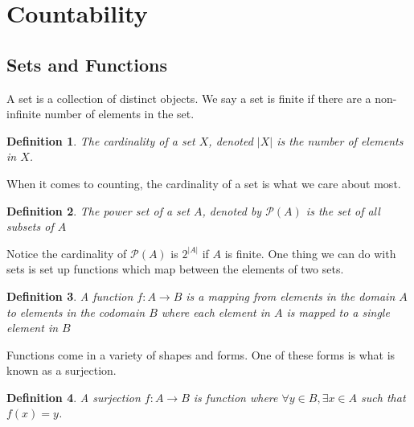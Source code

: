 \documentclass{article}
\newtheorem{definition}{Definition}
\begin{document}
\section{Countability}
\subsection{Sets and Functions}
A set is a collection of distinct objects. We say a set is finite if there are a non-infinite
number of elements in the set. 
\begin{definition}
    The cardinality of a set $X$, denoted $|X|$ is the number of elements in $X$.
\end{definition}
When it comes to counting, the cardinality of a set is what we care about most.
\begin{definition}
    The power set of a set $A$, denoted by $\mathcal{P}(A)$ is the set of all subsets of $A$
\end{definition}
Notice the cardinality of $\mathcal{P}(A)$ is $2^{|A|}$ if $A$ is finite.
One thing we can do with sets is set up functions which map between the elements of two sets.
\begin{definition}
    A function $f:A\rightarrow B$ is a mapping from elements in the domain $A$ to elements in the codomain $B$ where each element in $A$ is mapped to
    a single element in $B$
\end{definition}
Functions come in a variety of shapes and forms. One of these forms is what is known as a surjection.
\begin{definition}
    A surjection $f:A\rightarrow B$ is function where $\forall y\in B, \exists x\in A$ such that $f(x)=y$.
\end{definition}
\begin{figure}[h]
    \centering
\end{figure}
\end{document}
